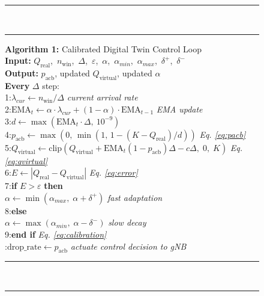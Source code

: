 \documentclass[conference]{IEEEtran}
\newcommand{\qreal}{Q_{\mathrm{real}}}
\newcommand{\qvirt}{Q_{\mathrm{virtual}}}
\newcommand{\pacb}{p_{\mathrm{acb}}}
\newcommand{\ema}{\mathrm{EMA}}
\begin{document}
\begin{figure}[t]
\vspace{-2pt}
\noindent\rule{\columnwidth}{0.5pt}\\[-5pt]
\noindent\rule{\columnwidth}{0.15pt}
\vspace{3pt}
{\small
\noindent\textbf{Algorithm 1:} Calibrated Digital Twin Control Loop\\[4pt]
\noindent\textbf{Input:} $\qreal$,\ $n_{\mathrm{win}}$,\ $\Delta$,\ $\varepsilon$,\ $\alpha$,\ $\alpha_{min}$,\ $\alpha_{max}$,\ $\delta^{+}$,\ $\delta^{-}$\\
\noindent\textbf{Output:} $\pacb$, updated $\qvirt$, updated $\alpha$\\[4pt]
\noindent\textbf{Every} $\Delta$ step:\\[2pt]
\noindent\phantom{0}1:\enspace $\lambda_{cur} \leftarrow n_{\mathrm{win}} / \Delta$ \hfill\textit{current arrival rate}\\
\noindent\phantom{0}2:\enspace $\ema_t \leftarrow \alpha\cdot\lambda_{cur}+(1-\alpha)\cdot\ema_{t-1}$ \hfill\textit{EMA update}\\
\noindent\phantom{0}3:\enspace $d \leftarrow \max\!\left(\ema_t\cdot\Delta,\ 10^{-9}\right)$\\
\noindent\phantom{0}4:\enspace $\pacb \leftarrow \max\!\left(0,\,\min\!\left(1,\,1-(K-\qreal)/d\right)\right)$ \hfill\textit{Eq. \eqref{eq:pacb}}\\
\noindent\phantom{0}5:\enspace $\qvirt \leftarrow \mathrm{clip}\!\left(\qvirt+\ema_t(1{-}\pacb)\Delta-c\Delta,\;0,\;K\right)$ \hfill\textit{Eq. \eqref{eq:qvirtual}}\\
\noindent\phantom{0}6:\enspace $E \leftarrow \left|\qreal - \qvirt\right|$ \hfill\textit{Eq. \eqref{eq:error}}\\
\noindent\phantom{0}7:\enspace \textbf{if} $E > \varepsilon$ \textbf{then}\\
\noindent\phantom{07:}\enspace $\alpha \leftarrow \min(\alpha_{max},\;\alpha + \delta^{+})$ \hfill\textit{fast adaptation}\\
\noindent\phantom{0}8:\enspace \textbf{else}\\
\noindent\phantom{08:}\enspace $\alpha \leftarrow \max(\alpha_{min},\;\alpha - \delta^{-})$ \hfill\textit{slow decay}\\
\noindent\phantom{0}9:\enspace \textbf{end if} \hfill\textit{Eq. \eqref{eq:calibration}}\\
:\enspace $\text{drop\_rate} \leftarrow \pacb$ \hfill\textit{actuate control decision to gNB}
}
\vspace{3pt}
\noindent\rule{\columnwidth}{0.15pt}\\[-5pt]
\noindent\rule{\columnwidth}{0.5pt}
\end{figure}
\end{document}
